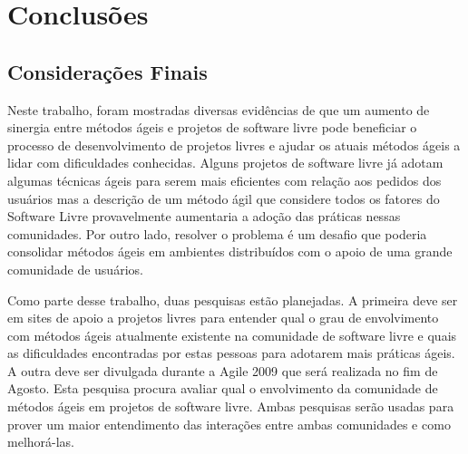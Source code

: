 \chapter{Conclusões}
\label{cap:conclusoes}

\section{Considerações Finais}

Neste trabalho, foram mostradas diversas evidências de que um aumento
de sinergia entre métodos ágeis e projetos de software livre pode
beneficiar o processo de desenvolvimento de projetos livres e ajudar
os atuais métodos ágeis a lidar com dificuldades conhecidas. Alguns
projetos de software livre já adotam algumas técnicas ágeis para serem
mais eficientes com relação aos pedidos dos usuários mas a descrição
de um método ágil que considere todos os fatores do Software Livre
provavelmente aumentaria a adoção das práticas nessas comunidades. Por
outro lado, resolver o problema é um desafio que poderia consolidar
métodos ágeis em ambientes distribuídos com o apoio de uma grande
comunidade de usuários.

Como parte desse trabalho, duas pesquisas estão planejadas. A primeira
deve ser em sites de apoio a projetos livres para entender qual o grau de
envolvimento com métodos ágeis atualmente existente na comunidade de
software livre e quais as dificuldades encontradas por estas pessoas
para adotarem mais práticas ágeis. A outra deve ser divulgada durante
a Agile 2009 que será realizada no fim de Agosto. Esta pesquisa
procura avaliar qual o envolvimento da comunidade de métodos ágeis em
projetos de software livre. Ambas pesquisas serão usadas para prover
um maior entendimento das interações entre ambas comunidades e como
melhorá-las.


